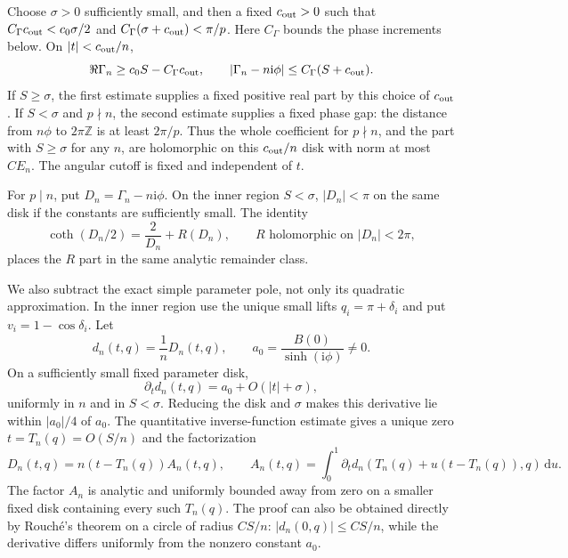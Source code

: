 \documentclass[11pt]{article}
\numberwithin{equation}{section}
\theoremstyle{definition}
\newcommand{\Z}{\mathbb Z}
\newcommand{\dd}{\,\mathrm d}
\newcommand{\ii}{\mathrm i}
\begin{document}
Choose $\sigma>0$ sufficiently small, and then a fixed
$c_{\rm out}>0$ such that
$C_\Gamma c_{\rm out}<c_0\sigma/2$ and
$C_\Gamma(\sigma+c_{\rm out})<\pi/p$.
Here $C_\Gamma$ bounds the phase increments below. On
$|t|<c_{\rm out}/n$,
\begin{equation}\label{eq:jets_c_over_n_estimate}
 \Re\Gamma_n\ge c_0S-C_\Gamma c_{\rm out},\qquad
 |\Gamma_n-n\ii\phi|\le C_\Gamma(S+c_{\rm out}).
\end{equation}
If $S\ge\sigma$, the first estimate supplies a fixed positive real
part by this choice of $c_{\rm out}$. If $S<\sigma$ and $p\nmid n$, the
second estimate supplies a fixed phase gap: the distance from
$n\phi$ to $2\pi\Z$ is at least $2\pi/p$. Thus the whole
coefficient for $p\nmid n$, and the part with $S\ge\sigma$ for any
$n$, are holomorphic on this $c_{\rm out}/n$ disk with norm at most $CE_n$.
The angular cutoff is fixed and independent of $t$.

For $p\mid n$, put $D_n=\Gamma_n-n\ii\phi$. On the inner region
$S<\sigma$, $|D_n|<\pi$ on the same disk if the constants are
sufficiently small. The identity
\begin{equation}\label{eq:jets_coth_subtraction}
 \coth(D_n/2)=\frac2{D_n}+R(D_n),
 \qquad R \text{ holomorphic on } |D_n|<2\pi,
\end{equation}
places the $R$ part in the same analytic remainder class.

We also subtract the exact simple parameter pole, not only its
quadratic approximation. In the inner region use the unique small
lifts $q_i=\pi+\delta_i$ and put $v_i=1-\cos\delta_i$. Let
\[
 d_n(t,q)=\frac1nD_n(t,q),\qquad
 a_0=\frac{B(0)}{\sinh(\ii\phi)}\ne0.
\]
On a sufficiently small fixed parameter disk,
\[
 \partial_t d_n(t,q)=a_0+O(|t|+\sigma),
\]
uniformly in $n$ and in $S<\sigma$. Reducing the disk and $\sigma$
makes this derivative lie within $|a_0|/4$ of $a_0$. The quantitative
inverse-function estimate gives a unique zero
$t=T_n(q)=O(S/n)$ and the factorization
\begin{equation}\label{eq:jets_exact_pole_factor}
 D_n(t,q)=n(t-T_n(q))A_n(t,q),\qquad
 A_n(t,q)=\int_0^1\partial_t d_n
       (T_n(q)+u(t-T_n(q)),q)\dd u.
\end{equation}
The factor $A_n$ is analytic and uniformly bounded away from zero on
a smaller fixed disk containing every such $T_n(q)$. The proof can
also be obtained directly by Rouch\'e's theorem on a circle of radius
$CS/n$: $|d_n(0,q)|\le CS/n$, while the derivative differs uniformly
from the nonzero constant $a_0$.
\end{document}
